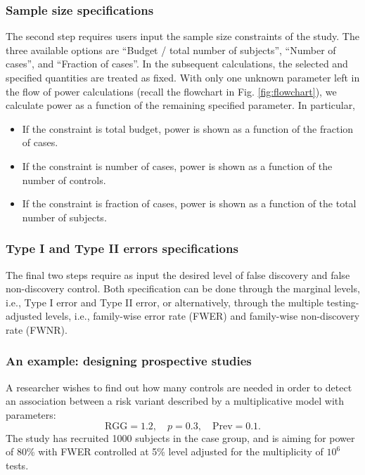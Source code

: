 \subsubsection{Sample size specifications}

The second step requires users input the sample size constraints of the study.
The three available options are ``Budget / total number of subjects'', ``Number of cases'', and ``Fraction of cases''.
In the subsequent calculations, the selected and specified quantities are treated as fixed.
With only one unknown parameter left in the flow of power calculations (recall the flowchart in Fig. \ref{fig:flowchart}), we calculate power as a function of the  remaining specified parameter.
In particular,

\begin{itemize}
    \item If the constraint is total budget, power is shown as a function of the fraction of cases.
    \item If the constraint is number of cases, power is shown as a function of the number of controls.
    \item If the constraint is fraction of cases, power is shown as a function of the total number of subjects.
\end{itemize}

\subsubsection{Type I and Type II errors specifications}

The final two steps require as input the desired level of false discovery and false non-discovery control.
Both specification can be done through the marginal levels, i.e., Type I error and Type II error, or alternatively, through the multiple testing-adjusted levels, i.e., family-wise error rate (FWER) and family-wise non-discovery rate (FWNR).

\subsubsection{An example: designing prospective studies}

A researcher wishes to find out how many controls are needed in order to detect an association between a risk variant described by a multiplicative model with parameters:
$$
\text{RGG} = 1.2, \quad p = 0.3, \quad \text{Prev} = 0.1.
$$
The study has recruited 1000 subjects in the case group, and is aiming for power of 80\% with FWER controlled at 5\% level adjusted for the multiplicity of $10^6$ tests.

